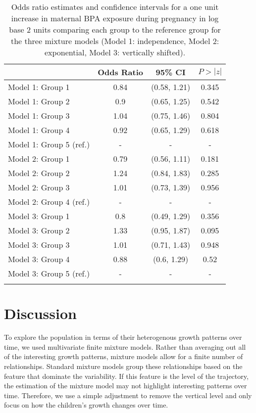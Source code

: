 \begin{table}[ht]
\centering 
\begin{tabular}{lccc}
  \thickhline
 & Odds Ratio & 95\% CI & $P>|z|$ \\ 
  \hline
Model 1: Group  1 & 0.84 & (0.58, 1.21) & 0.345 \\ 
  Model 1: Group  2 & 0.9 & (0.65, 1.25) & 0.542 \\ 
  Model 1: Group  3 & 1.04 & (0.75, 1.46) & 0.804 \\ 
  Model 1: Group  4 & 0.92 & (0.65, 1.29) & 0.618 \\ 
  Model 1: Group  5  (ref.) & - & - & - \\ 
  Model 2: Group  1 & 0.79 & (0.56, 1.11) & 0.181 \\ 
  Model 2: Group  2 & 1.24 & (0.84, 1.83) & 0.285 \\ 
  Model 2: Group  3 & 1.01 & (0.73, 1.39) & 0.956 \\ 
  Model 2: Group  4  (ref.) & - & - & - \\ 
  Model 3: Group  1 & 0.8 & (0.49, 1.29) & 0.356 \\ 
  Model 3: Group  2 & 1.33 & (0.95, 1.87) & 0.095 \\ 
  Model 3: Group  3 & 1.01 & (0.71, 1.43) & 0.948 \\ 
  Model 3: Group  4 & 0.88 & (0.6, 1.29) & 0.52 \\ 
  Model 3: Group  5  (ref.) & - & - & - \\ 
   \thickhline
\end{tabular}
\caption{Odds ratio estimates and confidence intervals for a one unit increase in maternal BPA exposure during pregnancy in log base 2 units comparing each group to the reference group for the three mixture models (Model 1: independence, Model 2: exponential, Model 3: vertically shifted). }
\label{tab:6-2}
\end{table}

\section{Discussion}
To explore the population in terms of their heterogenous growth patterns over time, we used multivariate finite mixture models. Rather than averaging out all of the interesting growth patterns, mixture models allow for a finite number of relationships. Standard mixture models group these relationships based on the feature that dominate the variability. If this feature is the level of the trajectory, the estimation of the mixture model may not highlight interesting patterns over time. Therefore, we use a simple adjustment to remove the vertical level and only focus on how the children's growth changes over time.

